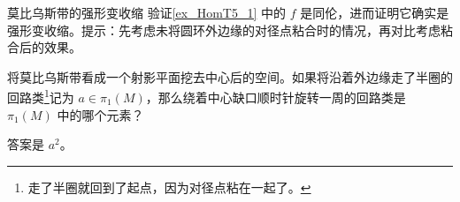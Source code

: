 \begin{exercise}{莫比乌斯带的强形变收缩}
验证\autoref{ex_HomT5_1} 中的 $f$ 是同伦，进而证明它确实是强形变收缩。提示：先考虑未将圆环外边缘的对径点粘合时的情况，再对比考虑粘合后的效果。
\end{exercise}

\begin{exercise}{}
将莫比乌斯带看成一个射影平面挖去中心后的空间。如果将沿着外边缘走了半圈的回路类\footnote{走了半圈就回到了起点，因为对径点粘在一起了。}记为 $a\in\pi_1(M)$，那么绕着中心缺口顺时针旋转一周的回路类是 $\pi_1(M)$ 中的哪个元素？

答案是 $a^2$。
\end{exercise}



